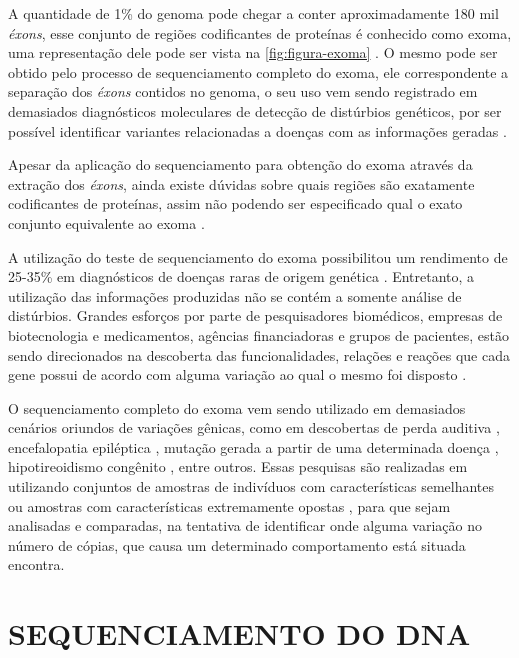 A quantidade de 1\% do genoma pode chegar a conter aproximadamente 180 mil \textit{éxons}, esse conjunto de regiões codificantes de proteínas é conhecido como exoma, uma representação dele pode ser vista na \autoref{fig:figura-exoma} \cite{Bamshad2011}. O mesmo pode ser obtido pelo processo de sequenciamento completo do exoma, ele correspondente a separação dos \textit{éxons} contidos no genoma, o seu uso vem sendo registrado em demasiados diagnósticos moleculares de detecção de distúrbios genéticos, por ser possível identificar variantes relacionadas a doenças com as informações geradas \cite{Bamshad2011,Lee2014,HutchisonIII2007}. 

Apesar da aplicação do sequenciamento para obtenção do exoma através da extração dos \textit{éxons}, ainda existe dúvidas sobre quais regiões são exatamente codificantes de proteínas, assim não podendo ser especificado qual o exato conjunto equivalente ao exoma \cite{Bamshad2011}.

A utilização do teste de sequenciamento do exoma possibilitou um rendimento de 25-35\% em diagnósticos de doenças raras de origem genética \cite{Bamshad2011}. Entretanto, a utilização das informações produzidas não se contém a somente análise de distúrbios. Grandes esforços por parte de pesquisadores biomédicos, empresas de biotecnologia e medicamentos, agências financiadoras e grupos de pacientes, estão sendo direcionados na descoberta das funcionalidades, relações e reações que cada gene possui de acordo com alguma variação ao qual o mesmo foi disposto \cite{Antonarakis2006}. 

O sequenciamento completo do exoma vem sendo utilizado em demasiados cenários oriundos de variações gênicas, como em descobertas de perda auditiva \cite{Likar2018}, encefalopatia epiléptica \cite{Allen2016}, mutação gerada a partir de uma determinada doença \cite{Lin2019}, hipotireoidismo congênito \cite{Fu2019}, entre outros. Essas pesquisas são realizadas em utilizando conjuntos de amostras de indivíduos com características semelhantes ou amostras com características extremamente opostas \cite{Bamshad2011}, para que sejam analisadas e comparadas, na tentativa de identificar onde alguma variação no número de cópias, que causa um determinado comportamento está situada encontra.

\section{SEQUENCIAMENTO DO DNA} 
\label{sec:sequenciamentoDoDna}


